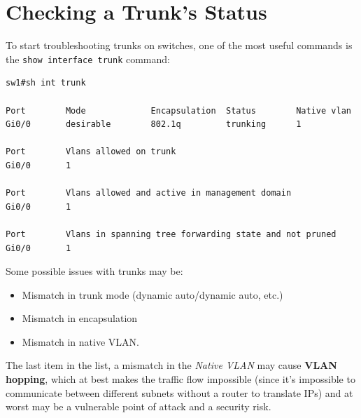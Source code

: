 \section{Checking a Trunk's Status}
To start troubleshooting trunks on switches, one of the most useful commands is the \verb|show interface trunk| command: 

\vspace{-15pt}
\begin{verbatim}
sw1#sh int trunk

Port        Mode             Encapsulation  Status        Native vlan
Gi0/0       desirable        802.1q         trunking      1

Port        Vlans allowed on trunk
Gi0/0       1

Port        Vlans allowed and active in management domain
Gi0/0       1

Port        Vlans in spanning tree forwarding state and not pruned
Gi0/0       1
\end{verbatim}
\vspace{-10pt}

\noindent
Some possible issues with trunks may be:
\vspace{-10pt}
\begin{itemize}
\item Mismatch in trunk mode (dynamic auto/dynamic auto, etc.)
\item Mismatch in encapsulation
\item Mismatch in native VLAN.
\end{itemize}

\noindent
The last item in the list, a mismatch in the \textit{Native VLAN} may cause \textbf{VLAN hopping}, which at best makes the traffic flow impossible (since it's impossible to communicate between different subnets without a router to translate IPs) and at worst may be a vulnerable point of attack and a security risk. 